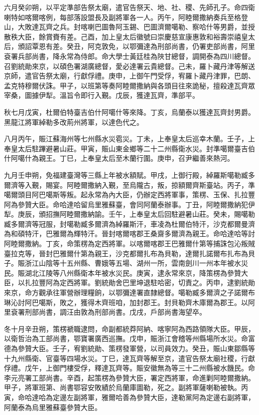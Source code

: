 \begin{pinyinscope}
六月癸卯朔，以平定準部告祭太廟，遣官告祭天、地、社、稷、先師孔子。命四衛喇特如喀爾喀例，每部落設盟長及副將軍各一人。丙午，阿睦爾撒納奏兵至格登山，大敗達瓦齊之兵。封喀喇巴圖魯阿玉錫、巴圖濟爾噶勒、察哈什等男爵，並授散秩大臣，餘賞賚有差。己酉，加上皇太后徽號曰崇慶慈宣康惠敦和裕壽崇禧皇太后，頒詔覃恩有差。癸丑，阿克敦免，以鄂彌達為刑部尚書，仍署吏部尚書，阿里袞署兵部尚書，降永常為侍郎。命大學士黃廷桂為陜甘總督，調開泰為四川總督。召劉統勛來京，以碩色署湖廣總督，愛必達署云貴總督。己未，羅卜藏丹津等解送京師，遣官告祭太廟，行獻俘禮。庚申，上御午門受俘，宥羅卜藏丹津罪，巴朗、孟克特穆爾伏誅。甲子，以班第等奏阿睦爾撒納與各頭目往來詭秘，擅殺達瓦齊眾宰桑，圖據伊犁。溫旨令即行入覲。戊辰，獲達瓦齊，準部平。

秋七月戊寅，杜爾伯特臺吉伯什阿噶什等來降。丁亥，烏蘭泰以獲達瓦齊封男爵。黑龍江將軍綽勒多改荊州將軍，以達色代之。

八月丙午，賑江蘇海州等七州縣水災雹災。丁未，上奉皇太后巡幸木蘭。壬子，上奉皇太后駐蹕避暑山莊。甲寅，賑山東金鄉等二十二州縣衛水災。封準噶爾臺吉伯什阿噶什為親王。丁巳，上奉皇太后至木蘭行圍。庚申，召尹繼善來熱河。

九月壬申朔，免福建臺灣等三縣上年被水額賦。甲戌，上御行殿，綽羅斯噶勒臧多爾濟等入覲，賜宴。阿睦爾撒納入覲，至烏隴古，叛，掠額爾齊斯臺站。丙子，準噶爾頭目阿巴噶斯等叛。起永常為內大臣，仍辦定西將軍事，策楞、玉保、扎拉豐阿為參贊大臣。命哈達哈留烏里雅蘇臺，會同阿蘭泰辦事。丁丑，阿睦爾撒納犯伊犁。庚辰，頒招撫阿睦爾撒納諭。壬午，上奉皇太后回駐避暑山莊。癸未，賜噶勒臧多爾濟等冠服，封噶勒臧多爾濟為綽羅斯汗，車凌為杜爾伯特汗，沙克都爾曼濟為和碩特汗，巴雅爾為輝特汗。晉封喀爾喀郡王桑齋多爾濟為親王。命哈達哈等討阿睦爾撒納。丁亥，命策楞為定西將軍。以喀爾喀郡王巴雅爾什第等捕誅包沁叛賊臺拉克等，晉封巴雅爾什第為親王，沙克都爾扎布為貝勒，達爾扎諾爾布扎布為貝子。賑浙江山陰等十五州縣、曹娥等五場、湖州一所，雲南劍川一州本年被水災民。賑湖北江陵等八州縣衛本年被水災民。庚寅，逮永常來京，降策楞為參贊大臣，以扎拉豐阿為定西將軍。劉統勛舍巴里坤退駐哈密，切責之。丙申，逮劉統勛來京，命方觀承往軍營辦理糧餉，以鄂彌達署直隸總督。噶勒臧多爾濟之子諾爾布琳沁討阿巴噶斯，敗之，獲得木齊班咱，加封郡王。封貝勒齊木庫爾為郡王。以阿里袞署刑部尚書，調汪由敦為刑部尚書。戊戌，戶部尚書海望卒。

冬十月辛丑朔，策楞褫職逮問，命副都統莽阿納、喀寧阿為西路領隊大臣。甲辰，以衛哲治為工部尚書，鄂寶署廣西巡撫。戊申，賑浙江會稽等州縣場所水災。命富德為參贊大臣。壬子，宥劉統勛、策楞發軍營，以司員效力。癸丑，賑山東鄒縣等十九州縣衛、官臺等四場水災。丁巳，達瓦齊等解至京，遣官告祭太廟社稷，行獻俘禮。戊午，上御門樓受俘，釋達瓦齊等。賑安徽無為等三十二州縣被水饑民。命李元亮署工部尚書。辛酉，起策楞為參贊大臣，署定西將軍，命進剿阿睦爾撒納。甲子，將軍班第、尚書鄂容安敗績於烏蘭庫圖勒，死之。副將軍薩喇勒被執。丙寅，命哈達哈為定邊左副將軍，雅爾哈善為參贊大臣，達勒黨阿為定邊右副將軍，阿蘭泰為烏里雅蘇臺參贊大臣。


\end{pinyinscope}
